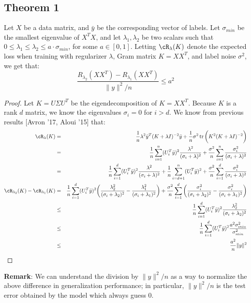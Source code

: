 \documentclass[12pt]{article}
\newcommand{\by}{\bar{y}}
\newcommand{\sm}{\sigma_{min}}
\providecommand{\tr}{\mathop{\rm tr}}
\begin{document}
\subsection{Theorem 1}
\begin{theorem}
Let $X$ be a data matrix, and $\by$ be the corresponding vector of labels. Let $\sm$ be the smallest eigenvalue of $X^T X$, and let $\lambda_1, \lambda_2$ be two scalars such that $0 \leq \lambda_1 \leq \lambda_2 \leq a\cdot \sm$, for some $a \in [0,1]$. Letting $\cR_{\lambda}(K)$ denote the expected loss when training with regularizer $\lambda$, Gram matrix $K = XX^T$, and label noise $\sigma^2$, we get that:
\begin{equation}
\frac{R_{\lambda_2}(XX^T) - R_{\lambda_1}(XX^T)}{\|y\|^2/n} \leq a^2
\end{equation}
\end{theorem}
\begin{proof}
Let $K = U\Sigma U^T$ be the eigendecomposition of $K = XX^T$. Because $K$ is a rank $d$ matrix, we know the eigenvalues $\sigma_i=0$ for $i > d$.  We know from previous results [Avron '17, Aloui '15] that:
\begin{eqnarray*}
\cR_{\lambda}(K) &=& \frac{1}{n}\lambda^2\by^T(K+\lambda I)^{-2} \by + \frac{1}{n}\sigma^2 \tr\bigg(K^2(K+\lambda I)^{-2}\bigg) \\
&=& \frac{1}{n}\sum_{i=1}^n (U_i^T \by)^2\frac{\lambda^2}{(\sigma_i + \lambda)^2} + \frac{\sigma^2}{n}\sum_{i=1}^n \frac{\sigma_i^2}{(\sigma_i + \lambda)^2} \\
&=& \frac{1}{n}\sum_{i=1}^d (U_i^T \by)^2\frac{\lambda^2}{(\sigma_i + \lambda)^2} +
\frac{1}{n}\sum_{i=d+1}^n (U_i^T \by)^2 +
 \frac{\sigma^2}{n}\sum_{i=1}^d \frac{\sigma_i^2}{(\sigma_i + \lambda)^2} \\
\cR_{\lambda_2}(K) - \cR_{\lambda_1}(K) 
&=& \frac{1}{n}\sum_{i=1}^d (U_i^T \by)^2\bigg(\frac{\lambda_2^2}{(\sigma_i + \lambda_2)^2} - \frac{\lambda_1^2}{(\sigma_i + \lambda_1)^2}\bigg) +
\frac{\sigma^2}{n}\sum_{i=1}^d \bigg(\frac{\sigma_i^2}{(\sigma_i + \lambda_2)^2} - \frac{\sigma_i^2}{(\sigma_i + \lambda_1)^2} \bigg)\\
&\leq& \frac{1}{n}\sum_{i=1}^d (U_i^T \by)^2\frac{\lambda_2^2}{(\sigma_i + \lambda_2)^2}\\
&\leq& \frac{1}{n}\sum_{i=1}^d (U_i^T \by)^2\frac{a^2 \sm^2}{\sm^2}\\
&\leq& \frac{a^2}{n}\|y\|^2
\end{eqnarray*}
\end{proof}
\textbf{Remark}: We can understand the division by $\|y\|^2/n$ as a way to normalize the above difference in generalization performance; in particular, $\|y\|^2/n$ is the test error obtained by the model which always guess $0$.
\end{document}
